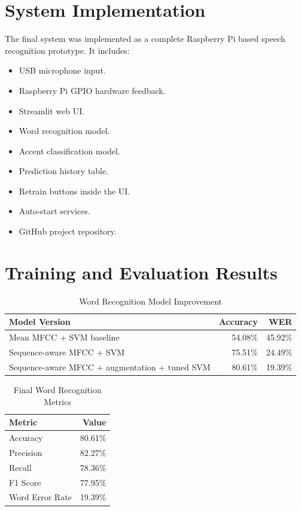 \documentclass[12pt,a4paper]{report}
\begin{document}
\section{System Implementation}
The final system was implemented as a complete Raspberry Pi based speech recognition prototype. It includes:
\begin{itemize}
    \item USB microphone input.
    \item Raspberry Pi GPIO hardware feedback.
    \item Streamlit web UI.
    \item Word recognition model.
    \item Accent classification model.
    \item Prediction history table.
    \item Retrain buttons inside the UI.
    \item Auto-start services.
    \item GitHub project repository.
\end{itemize}

\section{Training and Evaluation Results}
\begin{table}[H]
\centering
\caption{Word Recognition Model Improvement}
\begin{tabular}{p{7cm}rr}
\toprule
\textbf{Model Version} & \textbf{Accuracy} & \textbf{WER}\\
\midrule
Mean MFCC + SVM baseline & 54.08\% & 45.92\%\\
Sequence-aware MFCC + SVM & 75.51\% & 24.49\%\\
Sequence-aware MFCC + augmentation + tuned SVM & 80.61\% & 19.39\%\\
\bottomrule
\end{tabular}
\end{table}

\begin{table}[H]
\centering
\caption{Final Word Recognition Metrics}
\begin{tabular}{lr}
\toprule
\textbf{Metric} & \textbf{Value}\\
\midrule
Accuracy & 80.61\%\\
Precision & 82.27\%\\
Recall & 78.36\%\\
F1 Score & 77.95\%\\
Word Error Rate & 19.39\%\\
\bottomrule
\end{tabular}
\end{table}
\end{document}

